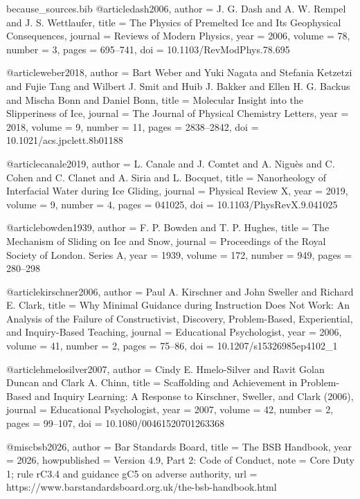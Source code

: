 \begin{filecontents*}{because_sources.bib}
@article{dash2006,
  author  = {J. G. Dash and A. W. Rempel and J. S. Wettlaufer},
  title   = {The Physics of Premelted Ice and Its Geophysical Consequences},
  journal = {Reviews of Modern Physics},
  year    = {2006},
  volume  = {78},
  number  = {3},
  pages   = {695--741},
  doi     = {10.1103/RevModPhys.78.695}
}

@article{weber2018,
  author  = {Bart Weber and Yuki Nagata and Stefania Ketzetzi and Fujie Tang and Wilbert J. Smit and Huib J. Bakker and Ellen H. G. Backus and Mischa Bonn and Daniel Bonn},
  title   = {Molecular Insight into the Slipperiness of Ice},
  journal = {The Journal of Physical Chemistry Letters},
  year    = {2018},
  volume  = {9},
  number  = {11},
  pages   = {2838--2842},
  doi     = {10.1021/acs.jpclett.8b01188}
}

@article{canale2019,
  author  = {L. Canale and J. Comtet and A. Nigu\`es and C. Cohen and C. Clanet and A. Siria and L. Bocquet},
  title   = {Nanorheology of Interfacial Water during Ice Gliding},
  journal = {Physical Review X},
  year    = {2019},
  volume  = {9},
  number  = {4},
  pages   = {041025},
  doi     = {10.1103/PhysRevX.9.041025}
}

@article{bowden1939,
  author  = {F. P. Bowden and T. P. Hughes},
  title   = {The Mechanism of Sliding on Ice and Snow},
  journal = {Proceedings of the Royal Society of London. Series A},
  year    = {1939},
  volume  = {172},
  number  = {949},
  pages   = {280--298}
}

@article{kirschner2006,
  author  = {Paul A. Kirschner and John Sweller and Richard E. Clark},
  title   = {Why Minimal Guidance during Instruction Does Not Work: An Analysis of the Failure of Constructivist, Discovery, Problem-Based, Experiential, and Inquiry-Based Teaching},
  journal = {Educational Psychologist},
  year    = {2006},
  volume  = {41},
  number  = {2},
  pages   = {75--86},
  doi     = {10.1207/s15326985ep4102_1}
}

@article{hmelosilver2007,
  author  = {Cindy E. Hmelo-Silver and Ravit Golan Duncan and Clark A. Chinn},
  title   = {Scaffolding and Achievement in Problem-Based and Inquiry Learning: A Response to Kirschner, Sweller, and Clark (2006)},
  journal = {Educational Psychologist},
  year    = {2007},
  volume  = {42},
  number  = {2},
  pages   = {99--107},
  doi     = {10.1080/00461520701263368}
}

@misc{bsb2026,
  author       = {{Bar Standards Board}},
  title        = {The {BSB} Handbook},
  year         = {2026},
  howpublished = {Version 4.9, Part 2: Code of Conduct},
  note         = {Core Duty 1; rule rC3.4 and guidance gC5 on adverse authority},
  url          = {https://www.barstandardsboard.org.uk/the-bsb-handbook.html}
}


\end{filecontents*}
